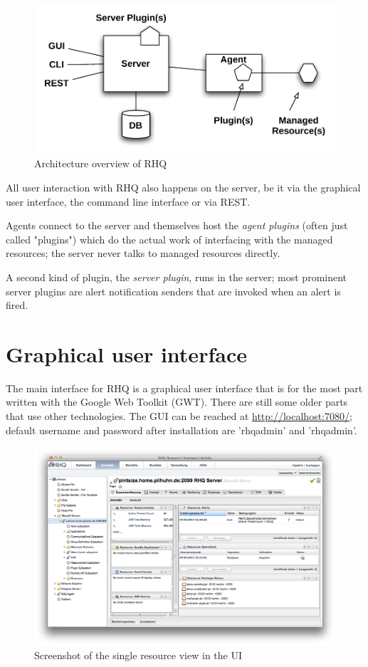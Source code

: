 \documentclass[twocolumn,10pt,a4paper]{article}
\begin{document}
\begin{figure}[h]
\noindent\includegraphics[width=\columnwidth]{graph/arch.pdf}
\caption{Architecture overview of RHQ}
\end{figure}

All user interaction with RHQ also happens on the server, be it via the graphical
user interface, the command line interface or via REST. 

Agents connect to the server and themselves host the \emph{agent plugins} (often
just called "plugins") which do the actual work of interfacing with the managed
resources; the server never talks to managed resources directly.

A second kind of plugin, the \emph{server plugin}, runs in the server; most
prominent server plugins are alert notification senders that are invoked when an
alert is fired.

\section{Graphical user interface}

The main interface for RHQ is a graphical user interface that is for the most part
written with the Google Web Toolkit (GWT). There are still some older parts that use other
technologies. The GUI can be reached at \url{http://localhost:7080/}; default
username and password after installation are 'rhqadmin' and 'rhqadmin'. 

\begin{figure}[h]
\noindent\includegraphics[width=\columnwidth]{graph/UI.png}
\caption{Screenshot of the single resource view in the UI}
\end{figure}
\end{document}
